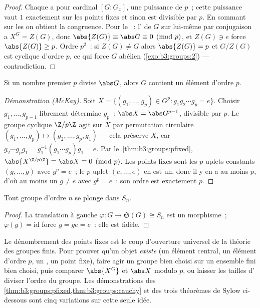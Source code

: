 \begin{proof}
Chaque  a pour cardinal $[G:G_x]$, une puissance de $p$~;
cette puissance vaut $1$ exactement sur les points fixes et sinon
est divisible par $p$. En sommant sur les  on obtient la
congruence. Pour le ~: l' de $G$ sur lui-même par
conjugaison a $X^G = Z(G)$, donc $\abs{Z(G)} \equiv \abs G
\equiv 0 \pmod p$, et $Z(G) \ni e$ force $\abs{Z(G)} \geq p$.
Ordre $p^2$~: si $Z(G) \neq G$ alors $\abs{Z(G)} = p$ et $G/Z(G)$
est cyclique d'ordre $p$, ce qui force $G$ abélien
(\cref{exo:b3:groups:2}) --- contradiction.
\end{proof}

\begin{theorem}[Cauchy]\label{thm:b3:groups:cauchy}
Si un nombre premier $p$ divise $\abs G$, alors $G$ contient un
élément d'ordre $p$.
\end{theorem}

\begin{proof}[Démonstration (McKay)]
Soit $X = \{(g_1, \dots, g_p) \in G^p : g_1 g_2 \cdots g_p = e\}$.
Choisir $g_1, \dots, g_{p-1}$ librement détermine $g_p$~: $\abs X
= \abs G^{p-1}$, divisible par $p$. Le groupe cyclique $\Z/p\Z$
agit sur $X$ par permutation circulaire $(g_1, \dots, g_p)
\mapsto (g_2, \dots, g_p, g_1)$ --- cela préserve $X$, car $g_2
\cdots g_p g_1 = g_1^{-1}(g_1 \cdots g_p)g_1 = e$. Par
le~\cref{thm:b3:groups:pfixed}, $\abs{X^{\Z/p\Z}} \equiv \abs X
\equiv 0 \pmod p$. Les points fixes sont les $p$-uplets constants
$(g, \dots, g)$ avec $g^p = e$~; le $p$-uplet $(e, \dots, e)$ en
est un, donc il y en a au moins $p$, d'où au moins un $g \neq e$
avec $g^p = e$~: son ordre est exactement $p$.
\end{proof}

\begin{theorem}[Cayley]\label{thm:b3:groups:cayley}
Tout groupe d'ordre $n$ se plonge dans $S_n$.
\end{theorem}

\begin{proof}
La translation à gauche $\varphi \colon G \to \mathfrak S(G)
\cong S_n$ est un morphisme~; $\varphi(g) = \mathrm{id}$ force $g
= ge = e$~: elle est fidèle.
\end{proof}

\begin{method}\label{met:b3:groups:counting}
Le dénombrement des points fixes est le coup d'ouverture
universel de la théorie des groupes finis. Pour prouver qu'un
objet \emph{existe} (un élément central, un élément d'ordre $p$,
un , un point fixe), faire agir un groupe bien
choisi sur un ensemble fini bien choisi, puis comparer
$\abs{X^G}$ et $\abs X$ modulo $p$, ou laisser les tailles
d' diviser l'ordre du groupe. Les démonstrations des
\cref{thm:b3:groups:pfixed,thm:b3:groups:cauchy} et des trois
théorèmes de Sylow ci-dessous sont cinq variations sur cette
seule idée.
\end{method}

